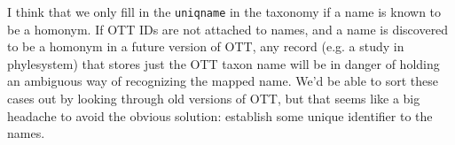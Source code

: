 \documentclass[11pt]{article}
\begin{document}
I think that we only fill in the {\tt uniqname} in the taxonomy if
  a name is known to be a homonym.
If OTT IDs are not attached to names, and a name is discovered to be a homonym
  in a future version of OTT,
  any record (e.g. a study in phylesystem) that stores just the OTT
  taxon name will be in danger of holding an ambiguous way of recognizing the
  mapped name.
We'd be able to sort these cases out by looking through old versions of OTT, but
  that seems like a big headache to avoid the obvious solution: establish some
  unique identifier to the names.



\end{document}

